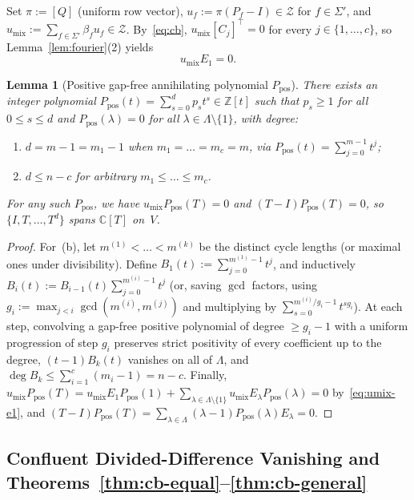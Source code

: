 \documentclass[11pt,a4paper]{article}
\newtheorem{lemma}[theorem]{Lemma}
\theoremstyle{definition}
\theoremstyle{remark}
\newcommand{\Z}{\mathbb{Z}}
\newcommand{\C}{\mathbb{C}}
\newcommand{\cZ}{\mathcal{Z}}
\newcommand{\ind}[1]{[#1]}
\begin{document}
Set $\pi := \ind{Q}$ (uniform row vector), $u_f := \pi(P_f - I) \in \cZ$ for $f \in \Sigma'$, and $u_{\mathrm{mix}} := \sum_{f \in \Sigma'} \beta_f u_f \in \cZ$. By~\eqref{eq:cb}, $u_{\mathrm{mix}}\ind{C_j}^\top = 0$ for every $j \in \{1,\dots,c\}$, so Lemma~\ref{lem:fourier}(2) yields
\begin{equation}
  u_{\mathrm{mix}} E_1 = 0.
  \label{eq:umix-e1}
\end{equation}

\begin{lemma}[Positive gap-free annihilating polynomial $P_{\mathrm{pos}}$]
\label{lem:ppos}
There exists an integer polynomial $P_{\mathrm{pos}}(t) = \sum_{s=0}^d p_s t^s \in \Z[t]$ such that $p_s \ge 1$ for all $0 \le s \le d$ and $P_{\mathrm{pos}}(\lambda) = 0$ for all $\lambda \in \Lambda \setminus \{1\}$, with degree:
\begin{enumerate}[label=(\alph*),nosep]
  \item $d = m - 1 = m_1 - 1$ when $m_1 = \dots = m_c = m$, via $P_{\mathrm{pos}}(t) = \sum_{j=0}^{m-1} t^j$;
  \item $d \le n - c$ for arbitrary $m_1 \le \dots \le m_c$.
\end{enumerate}
For any such $P_{\mathrm{pos}}$, we have $u_{\mathrm{mix}} P_{\mathrm{pos}}(T) = 0$ and $(T - I)P_{\mathrm{pos}}(T) = 0$, so $\{I, T, \dots, T^d\}$ spans $\C[T]$ on~$V$.
\end{lemma}
\begin{proof}
For~(b), let $m^{(1)} < \dots < m^{(k)}$ be the distinct cycle lengths (or maximal ones under divisibility). Define $B_1(t) := \sum_{j=0}^{m^{(1)}-1} t^j$, and inductively $B_i(t) := B_{i-1}(t)\sum_{j=0}^{m^{(i)}-1} t^j$ (or, saving $\gcd$ factors, using $g_i := \max_{j < i}\gcd(m^{(i)}, m^{(j)})$ and multiplying by $\sum_{s=0}^{m^{(i)}/g_i - 1} t^{s g_i}$). At each step, convolving a gap-free positive polynomial of degree $\ge g_i - 1$ with a uniform progression of step $g_i$ preserves strict positivity of every coefficient up to the degree, $(t-1)B_k(t)$ vanishes on all of $\Lambda$, and $\deg B_k \le \sum_{i=1}^c (m_i - 1) = n - c$. Finally, $u_{\mathrm{mix}} P_{\mathrm{pos}}(T) = u_{\mathrm{mix}} E_1 P_{\mathrm{pos}}(1) + \sum_{\lambda \in \Lambda \setminus \{1\}} u_{\mathrm{mix}} E_\lambda P_{\mathrm{pos}}(\lambda) = 0$ by~\eqref{eq:umix-e1}, and $(T - I)P_{\mathrm{pos}}(T) = \sum_{\lambda \in \Lambda} (\lambda - 1) P_{\mathrm{pos}}(\lambda) E_\lambda = 0$.
\end{proof}

\subsection{Confluent Divided-Difference Vanishing and Theorems~\texorpdfstring{\ref{thm:cb-equal}--\ref{thm:cb-general}}{2.1--2.2}}
\end{document}
